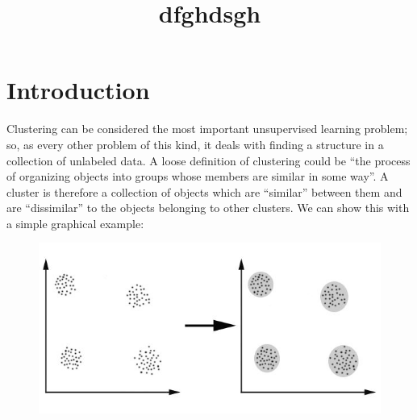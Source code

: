 \documentclass[11pt]{article}
\title{dfghdsgh}
\author{}
\begin{document}
\maketitle

\section{Introduction}

Clustering can be considered the most important unsupervised learning problem; so, as every other problem of this kind, it deals with finding a structure in a collection of unlabeled data.
A loose definition of clustering could be “the process of organizing objects into groups whose members are similar in some way”.
A cluster is therefore a collection of objects which are “similar” between them and are “dissimilar” to the objects belonging to other clusters.
We can show this with a simple graphical example:

\begin{figure}
\begin{center}
\includegraphics[scale=0.3]{clustering.jpg}
\end{center}

\end{figure}
\end{document}
